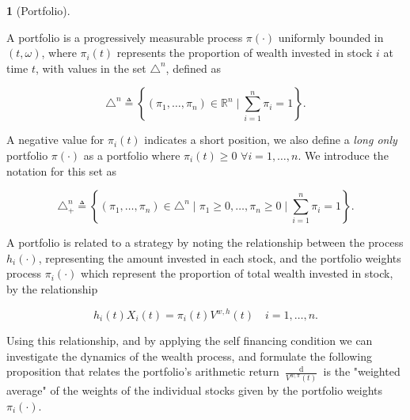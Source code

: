 \documentclass[british]{amsart} \usepackage{lmodern}
\numberwithin{equation}{section} \numberwithin{figure}{section}
\theoremstyle{plain} \newtheorem{thm}{\protect\theoremname}[section]
\theoremstyle{definition} \newtheorem{defn}[thm]{\protect\definitionname}
\theoremstyle{plain} \newtheorem{assumption}[thm]{\protect\assumptionname}
\theoremstyle{plain} \newtheorem{lem}[thm]{\protect\lemmaname}
\theoremstyle{plain} \newtheorem{prop}[thm]{\protect\propositionname}
\theoremstyle{remark} \newtheorem{rem}[thm]{\protect\remarkname}
\theoremstyle{plain} \newtheorem{cor}[thm]{\protect\corollaryname}
\renewcommand{\d}[1]{\mathop{\mathrm{d}{#1}}}
\newcommand{\defeq}{\mathop{\triangleq}} \newcommand{\almostsurely}{\text{a.s.}}
\newcommand{\rangei}{i=1,\dots,n} \newcommand{\measure}{\mathbb{P}}
\newcommand{\V}{V^{w,\pi}}
\begin{document}
\begin{defn} [Portfolio]
  \label{def:portfolio}

  A portfolio is a progressively measurable process $\pi(\cdot)$ uniformly
  bounded in $(t,\omega)$, where $\pi_{i}(t)$ represents the proportion of wealth
  invested in stock $i$ at time $t$, with values in the set $\triangle^{n}$,
  defined as 

  \begin{equation*}
    \triangle^{n} \defeq 
    \left\{
          (\pi_{1}, \dots, \pi_{n}) \in \mathbb{R}^{n} 
          \mid
          \sum_{i=1}^{n} \pi_{i} = 1
    \right\}.
  \end{equation*}

  A negative value for $\pi_{i}(t)$ indicates a short position, we also define a
  \textit{long only} portfolio $\pi(\cdot)$ as a portfolio where $\pi_{i}(t) \ge
  0$ $\forall \rangei$. We introduce the notation for this set as

  \begin{equation*}
    \triangle_{+}^{n} \defeq 
    \left\{
          (\pi_{1}, \dots, \pi_{n}) \in \triangle^{n} 
          \mid
          \pi_{1} \ge 0, \dots, \pi_{n} \ge 0
          \mid
          \sum_{i=1}^{n} \pi_{i} = 1
    \right\}.
  \end{equation*}

\end{defn}

A portfolio is related to a strategy by noting the relationship between the
process $h_{i}(\cdot)$, representing the amount invested in each stock, and the
portfolio weights process $\pi_{i}(\cdot)$ which represent the proportion of
total wealth invested in stock, by the relationship

\begin{equation}
  \label{eq:wealthinvestedbyportfolio}
  h_i(t)X_{i}(t) = \pi_{i}(t)V^{w,h}(t)
  \quad \rangei.
\end{equation}

Using this relationship, and by applying the self financing condition we can
investigate the dynamics of the wealth process, and formulate the following
proposition that relates the portfolio's arithmetic return
$\frac{\d{\V(t)}}{\V(t)}$ is the "weighted average" of the weights of the
individual stocks given by the portfolio weights $\pi_{i}(\cdot)$.
\end{document}
